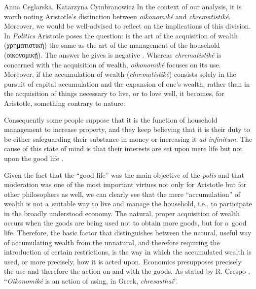 \begin{artengenv2auth}{Anna Ceglarska, Katarzyna Cymbranowicz}
In the context of our analysis, it is worth noting Aristotle's distinction between \textit{oikonomiké} and \textit{chrematistiké}. Moreover, we would be well-advised to reflect on the implications of this division. In \textit{Politics} Aristotle poses the question: is the art of the acquisition of wealth
(\textgreek{χρηματιστική})
the same as the art of the management of the household
(\textgreek{οἰκονομικῇ}).
The answer he gives is negative 
\parencite[][1.1256a]{aristotle_politics_1944}. %
 Whereas \textit{chrematistiké} is concerned with the acquisition of wealth, \textit{oikonomiké} focuses on its use. Moreover, if the accumulation of wealth (\textit{chrematistiké}) consists solely in the pursuit of capital accumulation and the expansion of one's wealth, rather than in the acquisition of things necessary to live, or to love well, it becomes, for Aristotle, something contrary to nature:



Consequently some people suppose that it is the function of household management to increase property, and they keep believing that it is their duty to be either safeguarding their substance in money or increasing it \textit{ad infinitum}. The cause of this state of mind is that their interests are set upon mere life but not upon the good life 
\parencite[][1.1257b]{aristotle_politics_1944}.%




Given the fact that the ``good life'' was the main objective of the \textit{polis} and that moderation was one of the most important virtues not only for Aristotle but for other philosophers as well, we can clearly see that the mere ``accumulation'' of wealth is not a~suitable way to live and manage the household, i.e., to participate in the broadly understood economy. The natural, proper acquisition of wealth occurs when the goods are being used not to obtain more goods, but for a~good life. Therefore, the basic factor that distinguishes between the natural, useful way of accumulating wealth from the unnatural, and therefore requiring the introduction of certain restrictions, is the way in which the accumulated wealth is used, or more precisely, how it is acted upon. Economics presupposes precisely the use and therefore the action on and with the goods. As stated by R. Crespo 
\parencite*[][p.772]{crespo_ontology_2006}, %
 ``\textit{Oikonomiké} is an action of using, in Greek, \textit{chresasthai}''.




\end{artengenv2auth}
